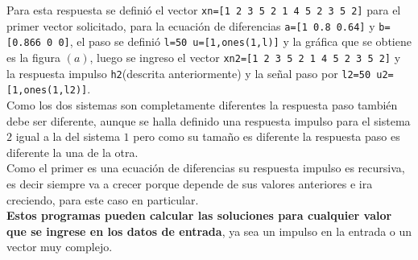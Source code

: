 \documentclass[onecolumn]{IEEEtran}
\begin{document}
\noindent
Para esta respuesta se definió el vector \verb'xn=[1 2 3 5 2 1 4 5 2 3 5 2]' para el primer vector solicitado, para la ecuación de diferencias \verb'a=[1 0.8 0.64]' y \verb'b=[0.866 0 0]', el paso se definió \verb'l=50 u=[1,ones(1,l)]' y la gráfica que se obtiene es la figura $(a)$, luego se ingreso el vector \verb'xn2=[1 2 3 5 2 1 4 5 2 3 5 2]' y la respuesta impulso \verb'h2'(descrita anteriormente) y la señal paso por \verb'l2=50 u2=[1,ones(1,l2)]'.\\
Como los dos sistemas son completamente diferentes la respuesta paso también debe ser diferente, aunque se halla definido una respuesta impulso para el sistema $2$ igual a la del sistema $1$ pero como su tamaño es diferente la respuesta paso es diferente la una de la otra.\\
Como el primer es una ecuación de diferencias su respuesta impulso es recursiva, es decir siempre va a crecer porque depende de sus valores anteriores e ira creciendo, para este caso en particular.\\
\textbf{Estos programas pueden calcular las soluciones para cualquier valor que se ingrese en los datos de entrada}, ya sea un impulso en la entrada o un vector muy complejo.
\end{document}
